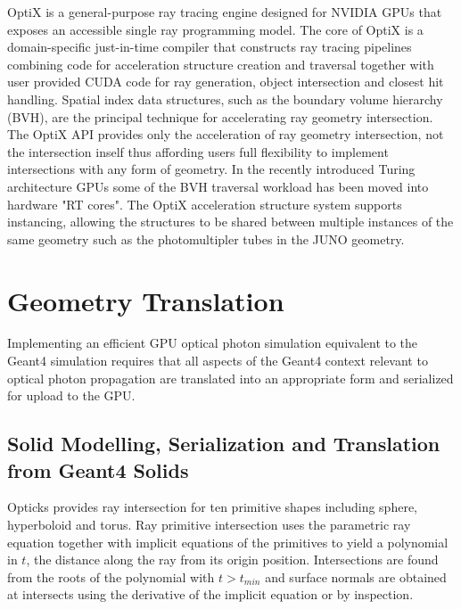 \documentclass{webofc}
\newcommand{\comment}[1]{}
\begin{document}
OptiX\cite{optixPaper} \cite{optixSite} is a general-purpose ray tracing engine
designed for NVIDIA GPUs that exposes an accessible single ray programming model.
The core of OptiX is a domain-specific just-in-time compiler that constructs 
ray tracing pipelines combining code for acceleration structure creation and traversal 
together with user provided CUDA code for ray generation, object intersection and closest hit handling.
Spatial index data structures, such as the boundary volume hierarchy (BVH), are the 
principal technique for accelerating ray geometry intersection.  The OptiX API\cite{optixDocs} 
provides only the acceleration of ray geometry intersection, not the intersection inself 
thus affording users full flexibility to implement intersections with any form of geometry. In the recently introduced Turing 
architecture GPUs some of the BVH traversal workload has been moved into hardware "RT cores".
The OptiX acceleration structure system supports instancing, allowing the structures to be shared 
between multiple instances of the same geometry such as the photomultipler tubes in the JUNO geometry.  


\section{Geometry Translation}
\label{geometry}

\comment{

1. CSG implementation, Kensler reference

}

Implementing an efficient GPU optical photon simulation equivalent to the Geant4 simulation 
requires that all aspects of the Geant4 context relevant to optical photon propagation are 
translated into an appropriate form and serialized for upload to the GPU.

\subsection{Solid Modelling, Serialization and Translation from Geant4 Solids}

Opticks provides ray intersection for ten primitive shapes including sphere, hyperboloid and torus.
Ray primitive intersection uses the parametric ray equation together with implicit equations 
of the primitives to yield a polynomial in $t$, the distance along the ray from its origin position. 
Intersections are found from the roots of the polynomial with $t > t_{min}$ and surface normals are obtained at intersects
using the derivative of the implicit equation or by inspection.
\end{document}
